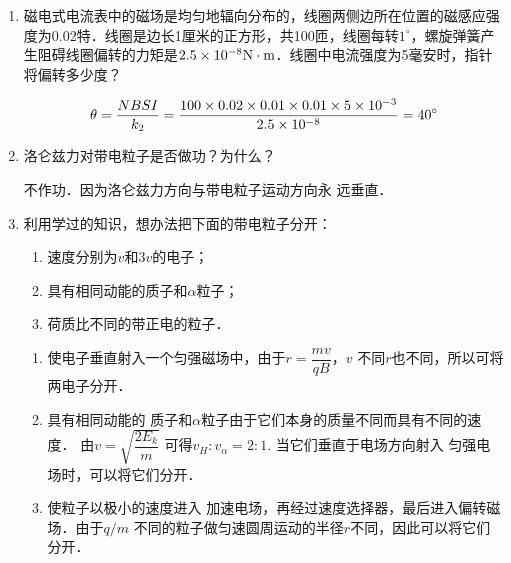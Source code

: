 \begin{enumerate}
\begin{solution}
    (a)正确，(b)不正确．因电流方向与磁感应强度方向平
    行时，通电导线不受磁场力作用，但磁感应强度不为零．(c)
    不正确．安培力方向与$B$、$I$均垂直，但$I$与$B$方向可以不
    垂直．
\end{solution}

\item 磁电式电流表中的磁场是均匀地辐向分布的，线圈两侧边所在位置的磁感应强度为0.02特．线圈是边长1厘米的正方形，共100匝，线圈每转$1^{\circ}$，螺旋弹簧产生阻碍线圈偏转的力矩是$2.5\times10^{-8}{\rm N}\cdot {\rm m}$．线圈中电流强度为5毫安时，指针将偏转多少度？


\begin{solution}
\[\theta=\frac{NBSI}{k_2}=\frac{100\times 0.02\times 0.01\times 0.01\times 5\times 10^{-3}}{2.5\times 10^{-8}}=40^{\circ}\]
\end{solution}

\item 洛仑兹力对带电粒子是否做功？为什么？    

\begin{solution}
    不作功．因为洛仑兹力方向与带电粒子运动方向永
    远垂直．
\end{solution}

\item 利用学过的知识，想办法把下面的带电粒子分开：
\begin{enumerate}
    \item 速度分别为$v$和$3v$的电子；
    \item 具有相同动能的质子和$\alpha$粒子；
    \item 荷质比不同的带正电的粒子．
\end{enumerate}

\begin{solution}
\begin{enumerate}
    \item 使电子垂直射入一个匀强磁场中，由于$r=\dfrac{mv}{qB}$，$v$
    不同$r$也不同，所以可将两电子分开．
    \item 具有相同动能的
    质子和$\alpha$粒子由于它们本身的质量不同而具有不同的速度．
    由$v=\sqrt{\dfrac{2E_k}{m}}$
    可得$v_H:v_{\alpha}=2:1$. 当它们垂直于电场方向射入
    匀强电场时，可以将它们分开．
    \item 使粒子以极小的速度进入
加速电场，再经过速度选择器，最后进入偏转磁场．由于$q/m$
不同的粒子做匀速圆周运动的半径$r$不同，因此可以将它们
分开．
\end{enumerate}
\end{solution}



\end{enumerate}

